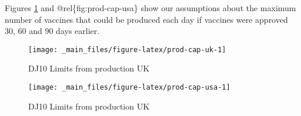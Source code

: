 \documentclass{article}
\begin{document}
Figures \ref{fig:prod-cap-uk} and @rel\{fig:prod-cap-usa\} show our assumptions about the maximum number of vaccines that could be produced each day if vaccines were approved 30, 60 and 90 days earlier.

\begin{figure}

{\centering \texttt{[image: \_main\_files/figure-latex/prod-cap-uk-1]} 

}

\caption{DJ10 Limits from production UK}\label{fig:prod-cap-uk}
\end{figure}

\begin{figure}

{\centering \texttt{[image: \_main\_files/figure-latex/prod-cap-usa-1]} 

}

\caption{DJ10 Limits from production UK}\label{fig:prod-cap-usa}
\end{figure}


\end{document}
